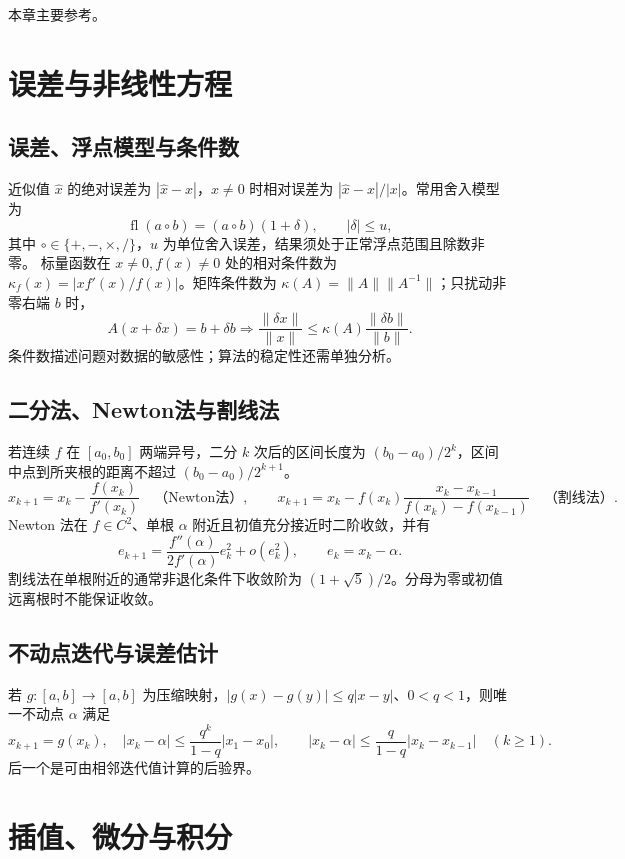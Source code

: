 \documentclass[../main.tex]{subfiles}
\begin{document}
本章主要参考\cite{fnc}。

\section{误差与非线性方程}
\subsection{误差、浮点模型与条件数}
近似值 $\widehat x$ 的绝对误差为 $|\widehat x-x|$，$x\ne0$ 时相对误差为 $|\widehat x-x|/|x|$。常用舍入模型为
\[
\operatorname{fl}(a\circ b)=(a\circ b)(1+\delta),\qquad |\delta|\le u,
\]
其中 $\circ\in\{+,-,\times,/\}$，$u$ 为单位舍入误差，结果须处于正常浮点范围且除数非零。
标量函数在 $x\ne0,f(x)\ne0$ 处的相对条件数为 $\kappa_f(x)=|xf'(x)/f(x)|$。矩阵条件数为 $\kappa(A)=\|A\|\|A^{-1}\|$；只扰动非零右端 $b$ 时，
\[
A(x+\delta x)=b+\delta b\Longrightarrow
\frac{\|\delta x\|}{\|x\|}\le\kappa(A)\frac{\|\delta b\|}{\|b\|}.
\]
条件数描述问题对数据的敏感性；算法的稳定性还需单独分析。
\subsection{二分法、Newton法与割线法}
若连续 $f$ 在 $[a_0,b_0]$ 两端异号，二分 $k$ 次后的区间长度为 $(b_0-a_0)/2^k$，区间中点到所夹根的距离不超过 $(b_0-a_0)/2^{k+1}$。
\[
x_{k+1}=x_k-\frac{f(x_k)}{f'(x_k)}\quad\text{（Newton法）},
\qquad x_{k+1}=x_k-f(x_k)\frac{x_k-x_{k-1}}{f(x_k)-f(x_{k-1})}\quad\text{（割线法）}.
\]
Newton 法在 $f\in C^2$、单根 $\alpha$ 附近且初值充分接近时二阶收敛，并有
\[
e_{k+1}=\frac{f''(\alpha)}{2f'(\alpha)}e_k^2+o(e_k^2),\qquad e_k=x_k-\alpha.
\]
割线法在单根附近的通常非退化条件下收敛阶为 $(1+\sqrt5)/2$。分母为零或初值远离根时不能保证收敛。
\subsection{不动点迭代与误差估计}
若 $g:[a,b]\to[a,b]$ 为压缩映射，$|g(x)-g(y)|\le q|x-y|$、$0<q<1$，则唯一不动点 $\alpha$ 满足
\[
x_{k+1}=g(x_k),\quad
|x_k-\alpha|\le\frac{q^k}{1-q}|x_1-x_0|,\qquad
|x_k-\alpha|\le\frac q{1-q}|x_k-x_{k-1}|\quad(k\ge1).
\]
后一个是可由相邻迭代值计算的后验界。
\section{插值、微分与积分}
\end{document}
